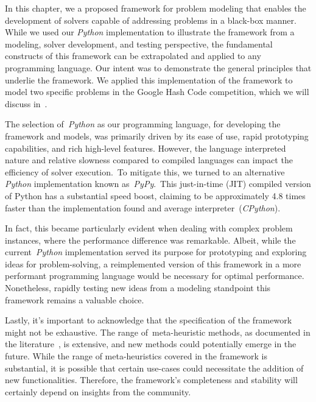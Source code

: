 In this chapter, we a proposed framework for problem modeling that enables the
development of solvers capable of addressing problems in a black-box manner.
While we used our \emph{Python} implementation to illustrate the framework from
a modeling, solver development, and testing perspective, the fundamental
constructs of this framework can be extrapolated and applied to any programming
language. Our intent was to demonstrate the general principles that underlie the
framework. We applied this implementation of the framework to model two specific
problems in the Google Hash Code competition, which we will discuss
in~.

The selection of~\emph{Python} as our programming language, for developing the
framework and models, was primarily driven by its ease of use, rapid prototyping
capabilities, and rich high-level features. However, the language interpreted
nature and relative slowness compared to compiled languages can impact the
efficiency of solver execution.~To mitigate this, we turned to an alternative
\emph{Python} implementation known as~\emph{PyPy}.~This just-in-time (JIT) compiled
version of Python has a substantial speed boost, claiming to be approximately
4.8 times faster than the implementation found and average interpreter~(\emph{CPython}).

In fact, this became particularly evident when dealing with complex problem
instances, where the performance difference was remarkable.  Albeit, while the
current~\emph{Python} implementation served its purpose for prototyping and
exploring ideas for problem-solving, a reimplemented version of this framework
in a more performant programming language would be necessary for optimal
performance. Nonetheless, rapidly testing new ideas from a modeling standpoint
this framework remains a valuable choice.

Lastly, it's important to acknowledge that the specification of the framework
might not be exhaustive. The range of~\acrshort{meta-heuristic} methods, as
documented in the literature~\cite{osman1996metaheuristics}, is extensive, and
new methods could potentially emerge in the future. While the range of
meta-heuristics covered in the framework is substantial, it is possible that
certain use-cases could necessitate the addition of new functionalities.
Therefore, the framework's completeness and stability will certainly depend on
insights from the community.